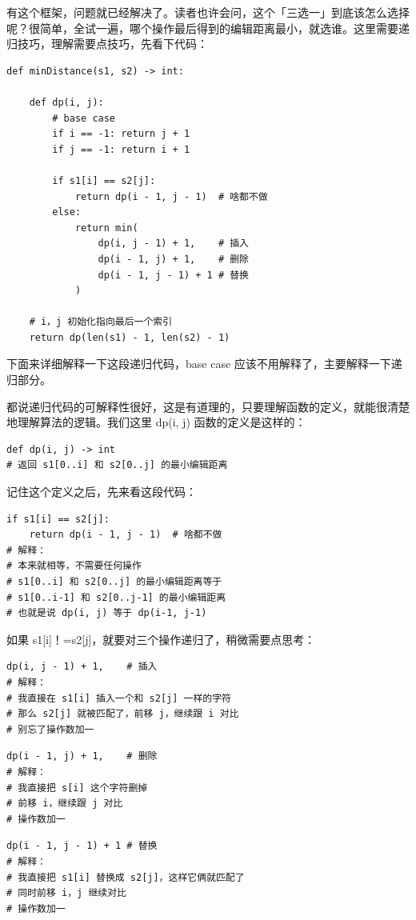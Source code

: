 \documentclass[12pt]{article}
\begin{document}
有这个框架，问题就已经解决了。读者也许会问，这个「三选一」到底该怎么选择呢？很简单，全试一遍，哪个操作最后得到的编辑距离最小，就选谁。这里需要递归技巧，理解需要点技巧，先看下代码：
\begin{lstlisting}
def minDistance(s1, s2) -> int:

    def dp(i, j):
        # base case
        if i == -1: return j + 1
        if j == -1: return i + 1
        
        if s1[i] == s2[j]:
            return dp(i - 1, j - 1)  # 啥都不做
        else:
            return min(
                dp(i, j - 1) + 1,    # 插入
                dp(i - 1, j) + 1,    # 删除
                dp(i - 1, j - 1) + 1 # 替换
            )
    
    # i，j 初始化指向最后一个索引
    return dp(len(s1) - 1, len(s2) - 1)
\end{lstlisting}

下面来详细解释一下这段递归代码，base case 应该不用解释了，主要解释一下递归部分。

都说递归代码的可解释性很好，这是有道理的，只要理解函数的定义，就能很清楚地理解算法的逻辑。我们这里 dp(i, j) 函数的定义是这样的：
\begin{lstlisting}
def dp(i, j) -> int
# 返回 s1[0..i] 和 s2[0..j] 的最小编辑距离
\end{lstlisting}

记住这个定义之后，先来看这段代码：
\begin{lstlisting}
if s1[i] == s2[j]:
    return dp(i - 1, j - 1)  # 啥都不做
# 解释：
# 本来就相等，不需要任何操作
# s1[0..i] 和 s2[0..j] 的最小编辑距离等于
# s1[0..i-1] 和 s2[0..j-1] 的最小编辑距离
# 也就是说 dp(i, j) 等于 dp(i-1, j-1)
\end{lstlisting}

如果 s1[i]！=s2[j]，就要对三个操作递归了，稍微需要点思考：
\begin{lstlisting}
dp(i, j - 1) + 1,    # 插入
# 解释：
# 我直接在 s1[i] 插入一个和 s2[j] 一样的字符
# 那么 s2[j] 就被匹配了，前移 j，继续跟 i 对比
# 别忘了操作数加一
\end{lstlisting}

\begin{lstlisting}
dp(i - 1, j) + 1,    # 删除
# 解释：
# 我直接把 s[i] 这个字符删掉
# 前移 i，继续跟 j 对比
# 操作数加一
\end{lstlisting}

\begin{lstlisting}
dp(i - 1, j - 1) + 1 # 替换
# 解释：
# 我直接把 s1[i] 替换成 s2[j]，这样它俩就匹配了
# 同时前移 i，j 继续对比
# 操作数加一
\end{lstlisting}
\end{document}
